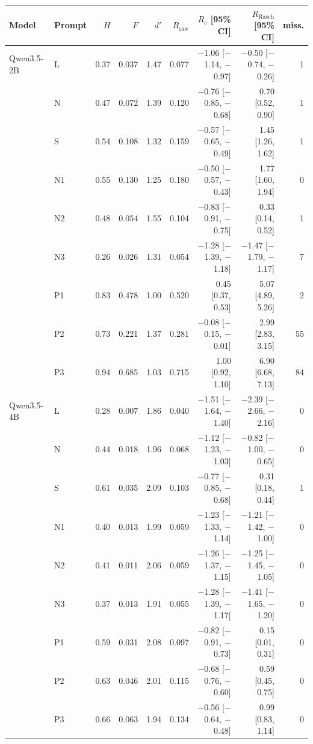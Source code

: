 \begin{tabular}{llrrrrrrr}
\toprule
Model & Prompt & $H$ & $F$ & $d'$ & $R_{\mathrm{raw}}$ & $R_c$ [95\% CI] & $R_{\mathrm{Rasch}}$ [95\% CI] & miss. \\
\midrule
Qwen3.5-2B & L & 0.37 & 0.037 & 1.47 & 0.077 & $-$1.06 [$-$1.14, $-$0.97] & $-$0.50 [$-$0.74, $-$0.26] & 1 \\
 & N & 0.47 & 0.072 & 1.39 & 0.120 & $-$0.76 [$-$0.85, $-$0.68] & 0.70 [0.52, 0.90] & 1 \\
 & S & 0.54 & 0.108 & 1.32 & 0.159 & $-$0.57 [$-$0.65, $-$0.49] & 1.45 [1.26, 1.62] & 1 \\
 & N1 & 0.55 & 0.130 & 1.25 & 0.180 & $-$0.50 [$-$0.57, $-$0.43] & 1.77 [1.60, 1.94] & 0 \\
 & N2 & 0.48 & 0.054 & 1.55 & 0.104 & $-$0.83 [$-$0.91, $-$0.75] & 0.33 [0.14, 0.52] & 1 \\
 & N3 & 0.26 & 0.026 & 1.31 & 0.054 & $-$1.28 [$-$1.39, $-$1.18] & $-$1.47 [$-$1.79, $-$1.17] & 7 \\
 & P1 & 0.83 & 0.478 & 1.00 & 0.520 & 0.45 [0.37, 0.53] & 5.07 [4.89, 5.26] & 2 \\
 & P2 & 0.73 & 0.221 & 1.37 & 0.281 & $-$0.08 [$-$0.15, $-$0.01] & 2.99 [2.83, 3.15] & 55 \\
 & P3 & 0.94 & 0.685 & 1.03 & 0.715 & 1.00 [0.92, 1.10] & 6.90 [6.68, 7.13] & 84 \\
\midrule
Qwen3.5-4B & L & 0.28 & 0.007 & 1.86 & 0.040 & $-$1.51 [$-$1.64, $-$1.40] & $-$2.39 [$-$2.66, $-$2.16] & 0 \\
 & N & 0.44 & 0.018 & 1.96 & 0.068 & $-$1.12 [$-$1.23, $-$1.03] & $-$0.82 [$-$1.00, $-$0.65] & 0 \\
 & S & 0.61 & 0.035 & 2.09 & 0.103 & $-$0.77 [$-$0.85, $-$0.68] & 0.31 [0.18, 0.44] & 1 \\
 & N1 & 0.40 & 0.013 & 1.99 & 0.059 & $-$1.23 [$-$1.33, $-$1.14] & $-$1.21 [$-$1.42, $-$1.00] & 0 \\
 & N2 & 0.41 & 0.011 & 2.06 & 0.059 & $-$1.26 [$-$1.37, $-$1.15] & $-$1.25 [$-$1.45, $-$1.05] & 0 \\
 & N3 & 0.37 & 0.013 & 1.91 & 0.055 & $-$1.28 [$-$1.39, $-$1.17] & $-$1.41 [$-$1.65, $-$1.20] & 0 \\
 & P1 & 0.59 & 0.031 & 2.08 & 0.097 & $-$0.82 [$-$0.91, $-$0.73] & 0.15 [0.01, 0.31] & 0 \\
 & P2 & 0.63 & 0.046 & 2.01 & 0.115 & $-$0.68 [$-$0.76, $-$0.60] & 0.59 [0.45, 0.75] & 0 \\
 & P3 & 0.66 & 0.063 & 1.94 & 0.134 & $-$0.56 [$-$0.64, $-$0.48] & 0.99 [0.83, 1.14] & 0 \\

\end{tabular}
